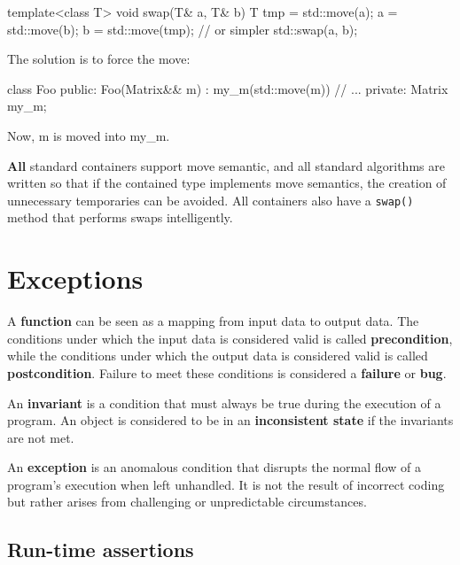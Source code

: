\begin{codeblock}[language=C++]
    template<class T>
    void swap(T& a, T& b) {
        T tmp = std::move(a);
        a = std::move(b);
        b = std::move(tmp);
    }
    // or simpler 
    std::swap(a, b);
\end{codeblock}

The solution is to force the move:
\begin{codeblock}[language=C++]
    class Foo{
    public:
        Foo(Matrix&& m) : my_m(std::move(m)) {}
        // ... 
    private:
        Matrix my_m;
    }
\end{codeblock}

Now, m is moved into my\_m. 

\textbf{All} standard containers support move semantic, and all standard algorithms are written so
that if the contained type implements move semantics, the creation of unnecessary temporaries
can be avoided. All containers also have a \texttt{swap()} method that performs swaps intelligently.





\section{Exceptions}

A \textbf{function} can be seen as a mapping from input data to output data. 
The conditions under which the input data is considered valid is called \textbf{precondition}, 
while the conditions under which the output data is considered valid is called \textbf{postcondition}.
Failure to meet these conditions is considered a \textbf{failure} or \textbf{bug}.

An \textbf{invariant} is a condition that must always be true during the execution of a program.
    An object is considered to be in an \textbf{inconsistent state} if the invariants are not met.

\begin{definitionblock}[Exception]
    An \textbf{exception} is an anomalous condition that disrupts the normal flow of a program's execution
    when left unhandled. It is not the result of incorrect coding but rather arises from challenging or
    unpredictable circumstances.
\end{definitionblock}


\subsection{Run-time assertions}

